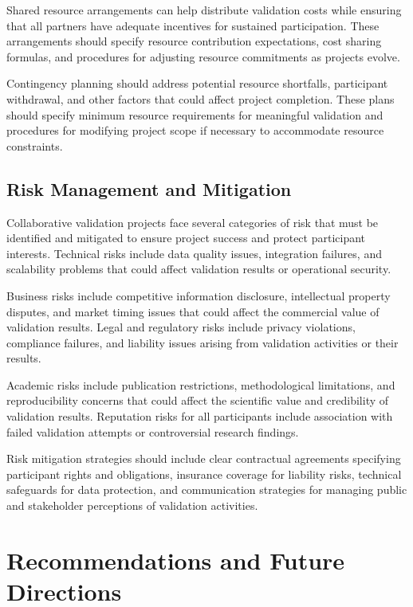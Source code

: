 \documentclass[10pt,twocolumn]{IEEEtran}
\begin{document}
Shared resource arrangements can help distribute validation costs while ensuring that all partners have adequate incentives for sustained participation. These arrangements should specify resource contribution expectations, cost sharing formulas, and procedures for adjusting resource commitments as projects evolve.

Contingency planning should address potential resource shortfalls, participant withdrawal, and other factors that could affect project completion. These plans should specify minimum resource requirements for meaningful validation and procedures for modifying project scope if necessary to accommodate resource constraints.

\subsection{Risk Management and Mitigation}

Collaborative validation projects face several categories of risk that must be identified and mitigated to ensure project success and protect participant interests. Technical risks include data quality issues, integration failures, and scalability problems that could affect validation results or operational security.

Business risks include competitive information disclosure, intellectual property disputes, and market timing issues that could affect the commercial value of validation results. Legal and regulatory risks include privacy violations, compliance failures, and liability issues arising from validation activities or their results.

Academic risks include publication restrictions, methodological limitations, and reproducibility concerns that could affect the scientific value and credibility of validation results. Reputation risks for all participants include association with failed validation attempts or controversial research findings.

Risk mitigation strategies should include clear contractual agreements specifying participant rights and obligations, insurance coverage for liability risks, technical safeguards for data protection, and communication strategies for managing public and stakeholder perceptions of validation activities.

\section{Recommendations and Future Directions}
\end{document}
